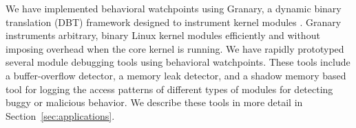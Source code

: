 \documentclass[letterpaper,twocolumn,10pt]{article}
\begin{document}



We have implemented behavioral watchpoints using Granary, a dynamic binary translation (DBT) framework designed to instrument kernel modules \cite{GranaryAtOSDI, DynamoRIOKernel}. Granary instruments arbitrary, binary Linux kernel modules efficiently and without imposing overhead when the core kernel is running. We have rapidly prototyped several module debugging tools using behavioral watchpoints. These tools include a buffer-overflow detector, a memory leak detector, and a shadow memory based tool for logging the access patterns of different types of modules for detecting buggy or malicious behavior. We describe these tools in more detail in Section~\ref{sec:applications}.









\end{document}
